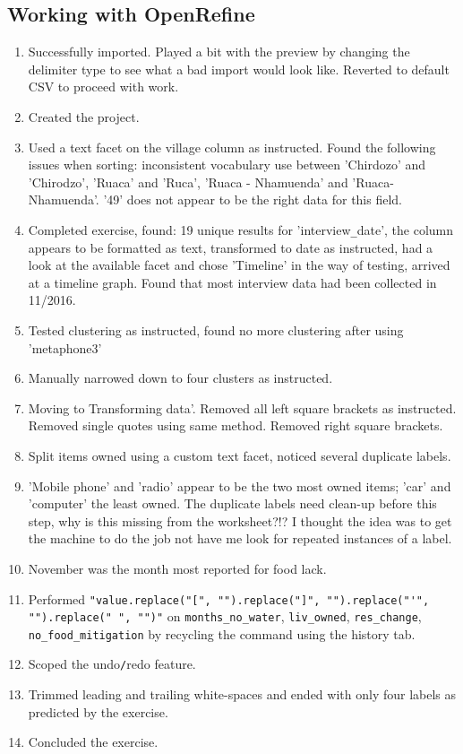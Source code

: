 \documentclass{article}
\begin{document}
\subsection{Working with OpenRefine}
\begin{enumerate}
    \item Successfully imported. Played a bit with the preview by changing the delimiter type to see what a bad import would look like. Reverted to default CSV to proceed with work.
    \item Created the project.
    \item Used a text facet on the village column as instructed. Found the following issues when sorting: inconsistent vocabulary use between 'Chirdozo' and 'Chirodzo', 'Ruaca' and 'Ruca', 'Ruaca - Nhamuenda' and 'Ruaca-Nhamuenda'. '49' does not appear to be the right data for this field.
    \item Completed exercise, found: 19 unique results for 'interview\verb|_|date', the column appears to be formatted as text, transformed to date as instructed, had a look at the available facet and chose 'Timeline' in the way of testing, arrived at a timeline graph. Found that most interview data had been collected in 11/2016.
    \item Tested clustering as instructed, found no more clustering after using 'metaphone3'
    \item Manually narrowed down to four clusters as instructed.
    \item Moving to Transforming data'. Removed all left square brackets as instructed. Removed single quotes using same method. Removed right square brackets.
    \item Split items owned using a custom text facet, noticed several duplicate labels.
    \item 'Mobile phone' and 'radio' appear to be the two most owned items; 'car' and 'computer' the least owned. The duplicate labels need clean-up before this step, why is this missing from the worksheet?!? I thought the idea was to get the machine to do the job not have me look for repeated instances of a label.
    \item November was the month most reported for food lack.
    \item Performed \newline \verb|"value.replace("[", "").replace("]", "").replace("'", "").replace(" ", "")"| on \verb|months_no_water|, \verb|liv_owned|, \verb|res_change|, \verb|no_food_mitigation| by recycling the command using the history tab.
    \item Scoped the undo\verb|/|redo feature.
    \item Trimmed leading and trailing white-spaces and ended with only four labels as predicted by the exercise.
    \item Concluded the exercise.
\end{enumerate}
\end{document}
